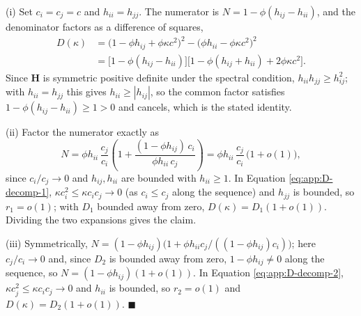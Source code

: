 (i) Set $c_i = c_j = c$ and $h_{ii} = h_{jj}$. The numerator is $N = 1 - \phi(h_{ij} - h_{ii})$, and the denominator factors as a difference of squares,
\begin{align*}
D(\kappa)
&= \bigl( 1 - \phi h_{ij} + \phi\kappa c^2 \bigr)^2 - \bigl( \phi h_{ii} - \phi\kappa c^2 \bigr)^2 \\
&= \bigl[ 1 - \phi(h_{ij} - h_{ii}) \bigr] \bigl[ 1 - \phi(h_{ij} + h_{ii}) + 2\phi\kappa c^2 \bigr].
\end{align*}
Since $\mathbf{H}$ is symmetric positive definite under the spectral condition, $h_{ii} h_{jj} \ge h_{ij}^2$; with $h_{ii} = h_{jj}$ this gives $h_{ii} \ge |h_{ij}|$, so the common factor satisfies $1 - \phi(h_{ij} - h_{ii}) \ge 1 > 0$ and cancels, which is the stated identity.

(ii) Factor the numerator exactly as
\begin{equation*}
N = \phi h_{ii}\,\frac{c_j}{c_i} \left( 1 + \frac{(1-\phi h_{ij})\,c_i}{\phi h_{ii}\, c_j} \right) = \phi h_{ii}\,\frac{c_j}{c_i}\,\bigl( 1 + o(1) \bigr),
\end{equation*}
since $c_i/c_j \to 0$ and $h_{ij}, h_{ii}$ are bounded with $h_{ii} \ge 1$. In Equation \eqref{eq:app:D-decomp-1}, $\kappa c_i^2 \le \kappa c_i c_j \to 0$ (as $c_i \le c_j$ along the sequence) and $h_{jj}$ is bounded, so $r_1 = o(1)$; with $D_1$ bounded away from zero, $D(\kappa) = D_1(1 + o(1))$. Dividing the two expansions gives the claim.

(iii) Symmetrically, $N = (1-\phi h_{ij})\bigl( 1 + \phi h_{ii} c_j/((1-\phi h_{ij}) c_i) \bigr)$; here $c_j/c_i \to 0$ and, since $D_2$ is bounded away from zero, $1 - \phi h_{ij} \neq 0$ along the sequence, so $N = (1-\phi h_{ij})(1 + o(1))$. In Equation \eqref{eq:app:D-decomp-2}, $\kappa c_j^2 \le \kappa c_i c_j \to 0$ and $h_{ii}$ is bounded, so $r_2 = o(1)$ and $D(\kappa) = D_2(1+o(1))$. \hfill$\blacksquare$

